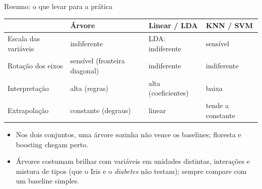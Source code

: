 \begin{frame}{Resumo: o que levar para a prática}
\small
\centering
\begin{tabular}{@{}p{}p{}p{}p{}@{}}
\toprule
 & \textbf{Árvore} & \textbf{Linear / LDA} & \textbf{KNN / SVM}\\
\midrule
Escala das variáveis & indiferente & LDA: indiferente & \alert{sensível}\\
Rotação dos eixos & \alert{sensível} (fronteira diagonal) & indiferente & indiferente\\
Interpretação & alta (regras) & alta (coeficientes) & baixa\\
Extrapolação & constante (degraus) & linear & tende a constante\\
\bottomrule
\end{tabular}

\vspace{6pt}
\raggedright
\begin{itemize}
  \item Nos dois conjuntos, \alert{uma árvore sozinha não vence} os baselines; floresta e boosting chegam perto.
  \item Árvores costumam brilhar com variáveis em unidades distintas, interações e mistura de tipos (que o Iris e o \emph{diabetes} não testam); sempre \alert{compare com um baseline simples}.
\end{itemize}
\end{frame}
